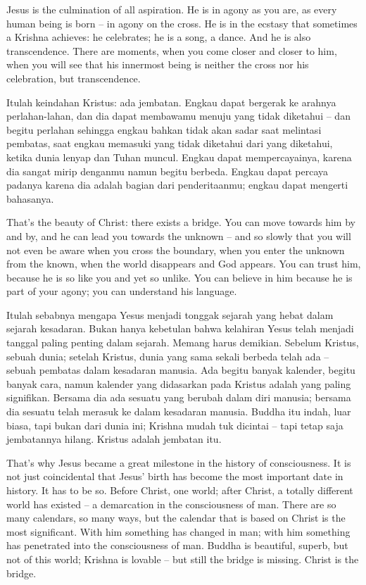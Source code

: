 \english
Jesus is the culmination of all aspiration. He is in agony as you are, as every human being is born -- in agony on the cross. He is in the ecstasy that sometimes a Krishna achieves: he celebrates; he is a song, a dance. And he is also transcendence. There are moments, when you come closer and closer to him, when you will see that his innermost being is neither the cross nor his celebration, but transcendence.

\bahasa
Itulah keindahan Kristus: ada jembatan. Engkau dapat bergerak ke arahnya perlahan-lahan, dan dia dapat membawamu menuju yang tidak diketahui -- dan begitu perlahan sehingga engkau bahkan tidak akan sadar saat melintasi pembatas, saat engkau memasuki yang tidak diketahui dari yang diketahui, ketika dunia lenyap dan Tuhan muncul. Engkau dapat mempercayainya, karena dia sangat mirip denganmu namun begitu berbeda. Engkau dapat percaya padanya karena dia adalah bagian dari penderitaanmu; engkau dapat mengerti bahasanya.

\english
That's the beauty of Christ: there exists a bridge. You can move towards him by and by, and he can lead you towards the unknown -- and so slowly that you will not even be aware when you cross the boundary, when you enter the unknown from the known, when the world disappears and God appears. You can trust him, because he is so like you and yet so unlike. You can believe in him because he is part of your agony; you can understand his language.

\bahasa
Itulah sebabnya mengapa Yesus menjadi tonggak sejarah yang hebat dalam sejarah kesadaran. Bukan hanya kebetulan bahwa kelahiran Yesus telah menjadi tanggal paling penting dalam sejarah. Memang harus demikian. Sebelum Kristus, sebuah dunia; setelah Kristus, dunia yang sama sekali berbeda telah ada -- sebuah pembatas dalam kesadaran manusia. Ada begitu banyak kalender, begitu banyak cara, namun kalender yang didasarkan pada Kristus adalah yang paling signifikan. Bersama dia ada sesuatu yang berubah dalam diri manusia; bersama dia sesuatu telah merasuk ke dalam kesadaran manusia. Buddha itu indah, luar biasa, tapi bukan dari dunia ini; Krishna mudah tuk dicintai -- tapi tetap saja jembatannya hilang. Kristus adalah jembatan itu.

\english
That's why Jesus became a great milestone in the history of consciousness. It is not just coincidental that Jesus' birth has become the most important date in history. It has to be so. Before Christ, one world; after Christ, a totally different world has existed -- a demarcation in the consciousness of man. There are so many calendars, so many ways, but the calendar that is based on Christ is the most significant. With him something has changed in man; with him something has penetrated into the consciousness of man. Buddha is beautiful, superb, but not of this world; Krishna is lovable -- but still the bridge is missing. Christ is the bridge.

